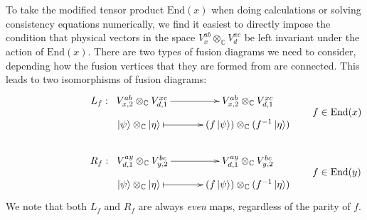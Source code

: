 \documentclass[12pt,a4paper]{article}
\newcommand{\tp}{\otimes}
\newcommand{\cc}{\mathbb{C}}
\newcommand{\End}{\text{End}}
\newcommand{\cl}{\mathbb{C}\ell}
\newcommand{\ket}[1]{\ensuremath{\left|#1\right\rangle}}
\begin{document}
To take the modified tensor product $\End(x)$ when doing calculations or solving consistency equations numerically, we find it easiest to directly impose the condition that physical vectors in the space $V^{ab}_x \tp_{\mathbb{C}} V^{xc}_d$ be left invariant under the action of $\text{End}(x)$. 
There are two types of fusion diagrams we need to consider, depending how the fusion vertices that they are formed from are connected. This leads to two isomorphisms of fusion diagrams:
\begin{align}
&\vcenter{\xymatrix @!0 @M=1mm @C=42mm{
 &L_f: \; \;V^{ab}_{x,2} \tp_{\mathbb{C}} V^{xc}_{d,1} \ar[r]            & V^{ab}_{x,2} \tp_{\mathbb{C}} V^{xc}_{d,1}  \\
		  &\;\;\;\;\;\;\; \ket{\psi}\tp_\mathbb{C} \ket{\eta}  \ar@{|->}[r] & (f\ket{\psi}) \tp_{\mathbb{C}} (f^{-1} \ket{\eta})  
		  }} \quad \quad f \in \text{End}(x)\\
		  \\		  
&		  \vcenter{\xymatrix @!0 @M=1mm @C=42mm{
		  &R_f: \; \;V^{ay}_{d,1} \tp_{\mathbb{C}} V^{bc}_{y,2} \ar[r]            & V^{ay}_{d,1} \tp_{\mathbb{C}} V^{bc}_{y,2} \\
		  &\;\;\;\;\;\;\; \ket{\psi}\tp_\mathbb{C} \ket{\eta}  \ar@{|->}[r] & (f\ket{\psi}) \tp_{\mathbb{C}} (f^{-1} \ket{\eta})
	}}	\quad \quad f \in \text{End}(y)
	\end{align}
We note that both $L_f$ and $R_f$ are always {\it even} maps, regardless of the parity of $f$. 


\end{document}
